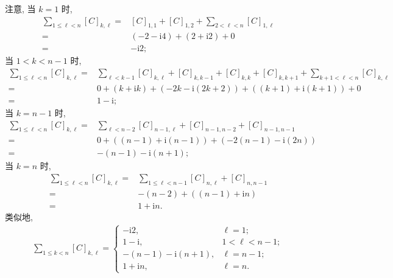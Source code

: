 \documentclass[../libro.tex]{subfiles}
\begin{document}
\begin{example}
    注意, 当 \(k = 1\) 时,
    \begin{align*}
        \sum_{1 \leq \ell < n} [C]_{k,\ell}
        = {} &
        [C]_{1,1} + [C]_{1,2}
        + \sum_{2 < \ell < n} [C]_{1,\ell}
        \\
        = {} &
        (-2 - \mathrm{i} 4) + (2 + \mathrm{i} 2) + 0
        \\
        = {} &
        {-} \mathrm{i} 2;
    \end{align*}
    当 \(1 < k < n-1\) 时,
    \begin{align*}
        \sum_{1 \leq \ell < n} [C]_{k,\ell}
        = {} &
        \sum_{\ell < k-1} [C]_{k,\ell}
        + [C]_{k,k-1} + [C]_{k,k} + [C]_{k,k+1}
        + \sum_{k+1 < \ell < n} [C]_{k,\ell}
        \\
        = {} &
        0
        + (k + \mathrm{i} k)
        + (-2k - \mathrm{i} (2k + 2))
        + ((k+1) + \mathrm{i} (k+1))
        + 0
        \\
        = {} &
        1 - \mathrm{i};
    \end{align*}
    当 \(k = n-1\) 时,
    \begin{align*}
        \sum_{1 \leq \ell < n} [C]_{k,\ell}
        = {} &
        \sum_{\ell < n-2} [C]_{n-1,\ell}
        + [C]_{n-1,n-2} + [C]_{n-1,n-1}
        \\
        = {} &
        0 + ((n-1) + \mathrm{i} (n-1))
        + (-2(n-1) - \mathrm{i} (2n))
        \\
        = {} &
        {-(n-1) - \mathrm{i} (n+1)};
    \end{align*}
    当 \(k = n\) 时,
    \begin{align*}
        \sum_{1 \leq \ell < n} [C]_{k,\ell}
        = {} &
        \sum_{1 \leq \ell < n-1} [C]_{n,\ell}
        + [C]_{n,n-1}
        \\
        = {} &
        {-(n-2)} + ((n-1) + \mathrm{i} n)
        \\
        = {} &
        1 + \mathrm{i} n.
    \end{align*}
    类似地,
    \begin{align*}
        \sum_{1 \leq k < n} [C]_{k,\ell} =
        \begin{cases}
            -\mathrm{i} 2,             & \ell = 1;         \\
            1 - \mathrm{i},            & 1 < \ell < n - 1; \\
            -(n-1) - \mathrm{i} (n+1), & \ell = n - 1;     \\
            1 + \mathrm{i} n,          & \ell = n.

\end{cases}
\end{align*}
\end{example}
\end{document}

